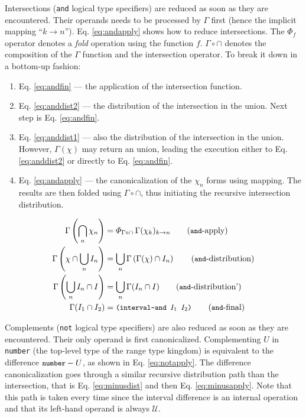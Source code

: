 \documentclass[format=sigconf]{acmart}
\newcommand\code[2][\small]{\sloppy\texttt{#1#2}}
\newcommand\mcode[2][\small]{\text{\code[#1]{#2}}}
\theoremstyle{definition}
\begin{document}
Intersections (\code{and} logical type specifiers) are reduced as soon as they
are encountered. Their operands needs to be processed by $\Gamma$ first (hence
the implicit mapping ``$k \rightarrow n$''). Eq. \ref{eq:andapply} shows how to
reduce intersections. The $\varPhi_f$ operator denotes a \emph{fold}
\cite{Hutton1999fold} operation using the function $f$. $\Gamma \circ \cap$
denotes the composition of the $\Gamma$ function and the intersection operator.
To break it down in a bottom-up fashion:
\begin{enumerate}
\item Eq. \ref{eq:andfin} --- the application of the intersection function.
\item Eq. \ref{eq:anddist2} --- the distribution of the intersection in the union.
  Next step is Eq. \ref{eq:andfin}.
\item Eq. \ref{eq:anddist1} --- also the distribution of the intersection in the
  union. However, $\Gamma(\chi)$ may return an union, leading the execution
  either to Eq. \ref{eq:anddist2} or directly to Eq. \ref{eq:andfin}.
\item Eq. \ref{eq:andapply} --- the canonicalization of the $\chi_n$ forms using
  mapping. The results are then folded using $\Gamma \circ \cap$, thus
  initiating the recursive intersection distribution.
\end{enumerate}

\begin{align}
  \Gamma\left(\bigcap_n \chi_n\right) &= \varPhi_{\Gamma \circ \cap}\, \Gamma(\chi_k)_{k \rightarrow n} \label{eq:andapply}\tag{\code{and}-apply}\\
  \Gamma\left(\chi \cap \bigcup_n I_n\right) &= \bigcup_n \Gamma\left(\Gamma(\chi) \cap I_n\right) \label{eq:anddist1}\tag{\code{and}-distribution}\\
  \Gamma\left(\bigcup_n I_n \cap I\right) &= \bigcup_n \Gamma(I_n \cap I) \label{eq:anddist2}\tag{\code{and}-distribution'}\\
  \Gamma(I_1 \cap I_2) &= \mcode{(interval-and $I_1$ $I_2$)} \label{eq:andfin}\tag{\code{and}-final}
\end{align}

Complements (\code{not} logical type specifiers) are also reduced as soon as
they are encountered. Their only operand is first canonicalized. Complementing
$U$ in \code{number} (the top-level type of the range type kingdom) is
equivalent to the difference $\mcode{number} - U$, as shown in Eq.
\ref{eq:notapply}. The difference canonicalization goes through a similar
recursive distribution path than the intersection, that is Eq.
\ref{eq:minusdist} and then Eq. \ref{eq:minusapply}. Note that this path is
taken every time since the interval difference is an internal operation and that
its left-hand operand is always $\mathcal{U}$.
\end{document}

